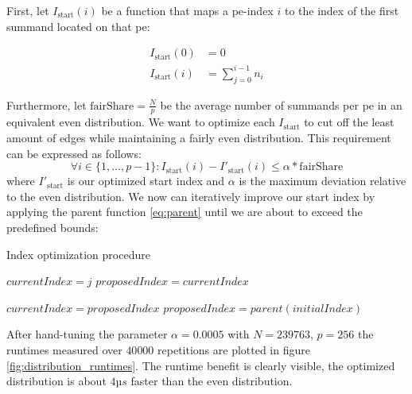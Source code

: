 First, let $I_\textrm{start}(i)$ be a function that maps a \gls{pe}-index $i$ to the index of the first summand located on that \gls{pe}:

\begin{align}
\label{eq:startIndexDefinition}
I_\textrm{start}(0) &= 0 \\
I_\textrm{start}(i) &= \sum_{j=0}^{i - 1} n_i
\end{align}

Furthermore, let $\textrm{fairShare} = \tfrac{N}{p}$ be the average number of summands per \gls{pe} in an equivalent even distribution. We want to optimize each $I_\textrm{start}$ to cut off the least amount of edges while maintaining a fairly even distribution. This requirement can be expressed as follows:
\begin{equation}
\label{eq:optimizedIndexBounds}
\forall i \in \{1, \ldots, p - 1\}: I_\textrm{start}(i) - I'_\textrm{start}(i) \leq \alpha * \textrm{fairShare}
\end{equation}
where $I'_\textrm{start}$ is our optimized start index and $\alpha$ is the maximum deviation relative to the even distribution. We now can iteratively
improve our start index by applying the parent function \eqref{eq:parent} until we are about to exceed the predefined bounds:

\begin{algorithm}
\caption{Index optimization procedure}\label{algo:optimizeIndex}
\DontPrintSemicolon
\SetAlgoLined
{}


$currentIndex = j$\;
$proposedIndex = currentIndex$\;

 {
	$currentIndex = proposedIndex$\;
	$proposedIndex = parent(initialIndex)$\;
}
\end{algorithm}

After hand-tuning the parameter $\alpha = 0.0005$ with $N = 239 763$, $p = 256$ the runtimes measured over $40 000$ repetitions are plotted in figure
\ref{fig:distribution_runtimes}. The runtime benefit is clearly visible, the optimized distribution is about $4µs$ faster than the even distribution.

